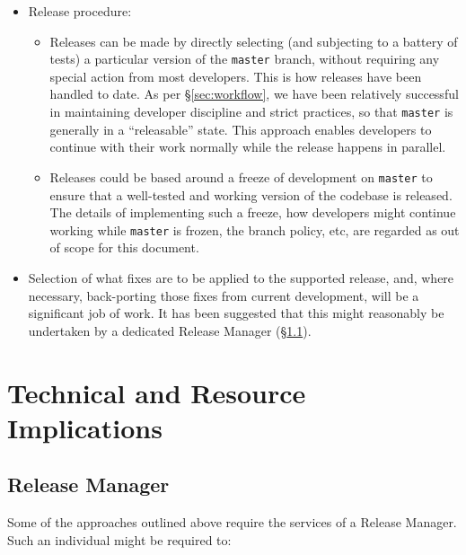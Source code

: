 \documentclass[letterpaper]{scrartcl}
\begin{document}
\begin{itemize}

  \item{Release procedure:

    \begin{itemize}

      \item{Releases can be made by directly selecting (and subjecting to a
      battery of tests) a particular version of the \texttt{master} branch,
      without requiring any special action from most developers. This is how
      releases have been handled to date. As per \S\ref{sec:workflow}, we have
      been relatively successful in maintaining developer discipline and
      strict practices, so that \texttt{master} is generally in a
      ``releasable'' state. This approach enables developers to continue with
      their work normally while the release happens in parallel.}

      \item{Releases could be based around a freeze of development on
      \texttt{master} to ensure that a well-tested and working version of the
      codebase is released. The details of implementing such a freeze, how
      developers might continue working while \texttt{master} is frozen, the
      branch policy, etc, are regarded as out of scope for this document.}

    \end{itemize}

  }

  \item{Selection of what fixes are to be applied to the supported release,
  and, where necessary, back-porting those fixes from current development,
  will be a significant job of work. It has been suggested that this might
  reasonably be undertaken by a dedicated Release Manager
  (\S\ref{sec:releasemanager}).}

\end{itemize}

\section{Technical and Resource Implications}
\label{sec:resource}

\subsection{Release Manager}
\label{sec:releasemanager}

Some of the approaches outlined above require the services of a Release
Manager. Such an individual might be required to:
\end{document}
